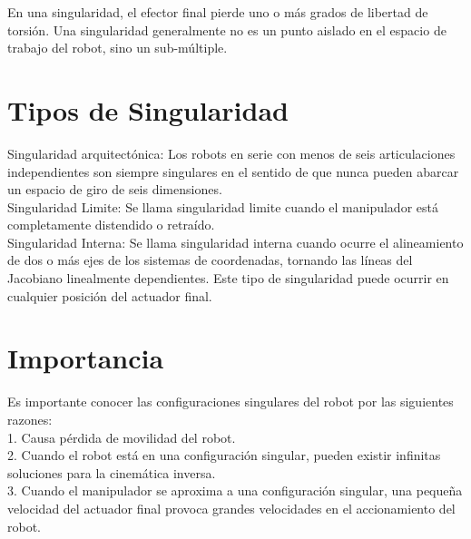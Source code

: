 \documentclass[11pt,a4paper,oldfontcommands,oneside]{memoir}
\begin{document}
En una singularidad, el efector final pierde uno o más grados de libertad de torsión. Una singularidad generalmente no es un punto aislado en el espacio de trabajo del robot, sino un sub-múltiple.\\

\section{Tipos de Singularidad}
Singularidad arquitectónica: Los robots en serie con menos de seis articulaciones independientes son siempre singulares en el sentido de que nunca pueden abarcar un espacio de giro de seis dimensiones.\\

Singularidad Limite: Se llama singularidad limite cuando el manipulador está completamente distendido o retraído.\\

Singularidad Interna: Se llama singularidad interna cuando ocurre el alineamiento de dos o más ejes de los sistemas de coordenadas, tornando las líneas del Jacobiano linealmente dependientes. Este tipo de singularidad puede ocurrir en cualquier posición del actuador final.\\

\section{Importancia }
Es importante conocer las configuraciones singulares del robot por las siguientes razones: 
\\

1. Causa pérdida de movilidad del robot.
\\

2. Cuando el robot está en una configuración singular, pueden existir infinitas soluciones para la cinemática inversa.
\\

3. Cuando el manipulador se aproxima a una configuración singular, una pequeña velocidad del actuador final provoca grandes velocidades en el accionamiento del robot.


\vspace{2cm}
\hfill



\end{document}
